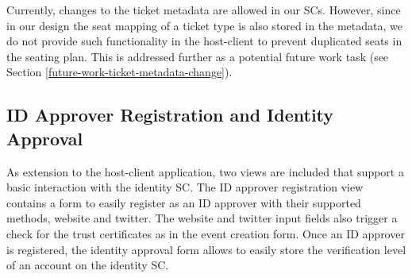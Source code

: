 Currently, changes to the ticket metadata are allowed in our SCs. However, since in our design the seat mapping of a ticket type is also stored in the metadata, we do not provide such functionality in the host-client to prevent duplicated seats in the seating plan. This is addressed further as a potential future work task (see Section \ref{future-work-ticket-metadata-change}).

\subsection{ID Approver Registration and Identity Approval}
As extension to the host-client application, two views are included that support a basic interaction with the identity SC. The ID approver registration view contains a form to easily register as an ID approver with their supported methods, website and twitter. The website and twitter input fields also trigger a check for the trust certificates as in the event creation form. Once an ID approver is registered, the identity approval form allows to easily store the verification level of an account on the identity SC.
